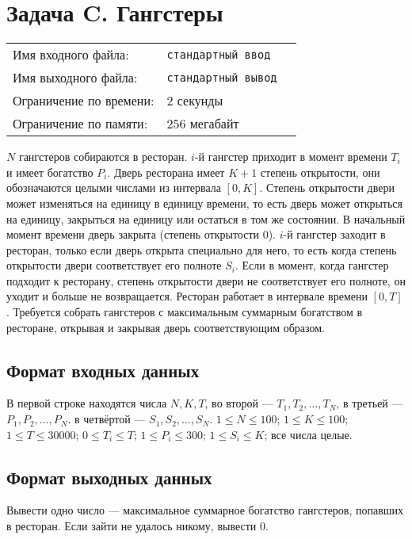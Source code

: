 \documentclass[12pt]{scrartcl}
\newcommand{\inputFile}{стандартный ввод}
\newcommand{\outputFile}{стандартный вывод}
\begin{document}
\section*{Задача C. Гангстеры}

\begin{tabularx}{\textwidth}{l l X}
    Имя входного файла: & \texttt{\inputFile} \\
    Имя выходного файла: & \texttt{\outputFile} \\
    Ограничение по времени: & $2$ секунды \\
    Ограничение по памяти: & $256$ мегабайт \\
\end{tabularx}

$N$ гангстеров собираются в ресторан. $i$-й гангстер приходит в момент времени
$T_i$ и имеет богатство $P_i$. Дверь ресторана имеет $K + 1$ степень открытости, они
обозначаются целыми числами из интервала $[0, K]$. Степень открытости двери
может изменяться на единицу в единицу времени, то есть дверь может открыться
на единицу, закрыться на единицу или остаться в том же состоянии. В начальный
момент времени дверь закрыта (степень открытости 0). $i$-й гангстер заходит в ресторан,
только если дверь открыта специально для него, то есть когда степень открытости
двери соответствует его полноте $S_i$. Если в момент, когда гангстер подходит к
ресторану, степень открытости двери не соответствует его полноте, он уходит
и больше не возвращается. Ресторан работает в интервале времени $[0, T]$.
Требуется собрать гангстеров с максимальным суммарным богатством в ресторане,
открывая и закрывая дверь соответствующим образом.

\subsection*{Формат входных данных}
В первой строке находятся числа $N, K, T$, во второй --- $T_1, T_2, \ldots, T_N$,
в третьей --- $P_1, P_2, \ldots, P_N$. в четвёртой --- $S_1, S_2, \ldots, S_N$.
$1 \le N \le 100$;
$1 \le K \le 100$;
$1 \le T \le 30000$;
$0 \le T_i \le T$;
$1 \le P_i \le 300$;
$1 \le S_i \le K$; все числа целые.

\subsection*{Формат выходных данных}
Вывести одно число --- максимальное суммарное богатство гангстеров,
попавших в ресторан. Если зайти не удалось никому, вывести 0.
\end{document}
